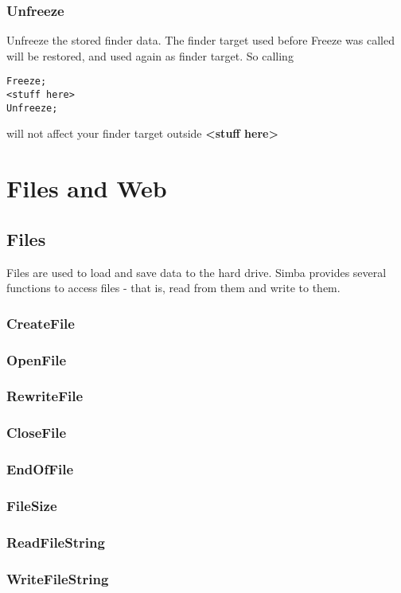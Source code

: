 \documentclass[a4paper]{report}
\begin{document}
\subsection{Unfreeze} 

Unfreeze the stored finder data. The finder target used before Freeze was called
will be restored, and used again as finder target. So calling
\begin{verbatim}
Freeze;
<stuff here>
Unfreeze;
\end{verbatim}
will not affect your finder target outside \textbf{<stuff here>}

\chapter{Files and Web}

\section{Files}

Files are used to load and save data to the hard drive.
Simba provides several functions to access files - that is, read
from them and write to them.

\subsection{CreateFile}
\subsection{OpenFile}
\subsection{RewriteFile}
\subsection{CloseFile}
\subsection{EndOfFile}
\subsection{FileSize}
\subsection{ReadFileString}
\subsection{WriteFileString}
\end{document}
